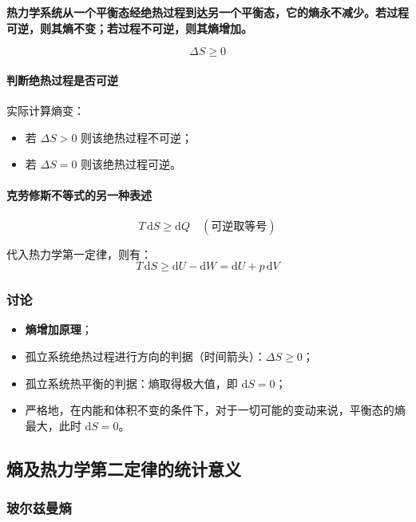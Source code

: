\documentclass[UTF8]{ctexart}
\begin{document}
\textbf{热力学系统从一个平衡态经绝热过程到达另一个平衡态，它的熵永不减少。若过程可逆，则其熵不变；若过程不可逆，则其熵增加。}

\[
\boxed{\Delta S\ge 0}
\]

\paragraph{判断绝热过程是否可逆}
实际计算熵变：
\begin{itemize}[leftmargin=2em]
  \item 若 $\Delta S>0$ 则该绝热过程不可逆；
  \item 若 $\Delta S=0$ 则该绝热过程可逆。
\end{itemize}

\paragraph{克劳修斯不等式的另一种表述}
\[
\boxed{T\,\mathrm{d}S\ge \mathrm{d}Q}\quad(\text{可逆取等号})
\]

代入热力学第一定律，则有：
\[
T\,\mathrm{d}S\ge \mathrm{d}U-\mathrm{d}W=\mathrm{d}U+p\,\mathrm{d}V
\]

\subsubsection{讨论}

\begin{itemize}[leftmargin=2em]
  \item \textbf{熵增加原理}；
  \item 孤立系统绝热过程进行方向的判据（时间箭头）：$\Delta S\ge 0$；
  \item 孤立系统热平衡的判据：熵取得极大值，即 $\mathrm{d}S=0$；
  \item 严格地，在内能和体积不变的条件下，对于一切可能的变动来说，平衡态的熵最大，此时 $\mathrm{d}S=0$。
\end{itemize}

\subsection{熵及热力学第二定律的统计意义}

\subsubsection{玻尔兹曼熵}
\end{document}

